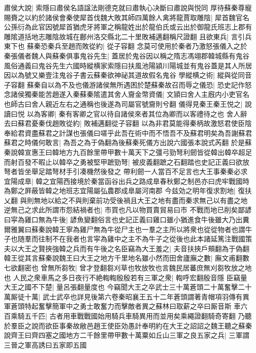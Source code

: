 肅侯大說|{
	索隱曰肅侯名語諡法剛德克就曰肅執心决斷曰肅說與悦同}
厚待蘇秦尊寵賜賚之以約於諸侯會秦使犀首伐魏大敗其師四萬餘人禽將龍賈取雕陰|{
	犀首魏官名公孫衍為此官因號犀首猶虎牙將軍之稱龍姓出於龍伯氏或云出於御龍氏班志上郡有雕隂道括地志雕陰故城在鄜州洛交縣北二十里敗補邁翻稱尺證翻}
且欲東兵|{
	言引兵東下也}
蘇秦恐秦兵至趙而敗從約|{
	從子容翻}
念莫可使用於秦者乃激怒張儀入之於秦張儀者魏人與蘇秦俱事鬼谷先生|{
	蓋居於鬼谷因以稱之隋志馮翊郡韓城縣有鬼谷風俗通義曰鬼谷先生六國時縱横家索隱曰扶風池陽潁川陽城並有鬼谷蓋是其人所居因以為號又樂壹注鬼谷子書云蘇秦欲神祕其道故假名鬼谷}
學縱横之術|{
	縱與從同音子容翻}
蘇秦自以為不及也儀游諸侯無所遇困於楚蘇秦故召而辱之儀恐|{
	恐史記作怒}
念諸侯獨秦能苦趙遂入秦蘇秦隂遣其舍人齎金幣資儀|{
	文頴曰舍人主廐内小吏官名也師古曰舍人親近左右之通稱也後遂為司屬官號齎則兮翻}
儀得見秦王秦王悦之|{
	說讀曰悦}
以為客卿|{
	秦有客卿之官以待自諸侯來者其位為卿而以客禮待之也}
舍人辭去曰蘇君憂秦伐趙敗從約|{
	敗補邁翻從子容翻}
以為非君莫能得秦柄故激怒君使臣陰奉給君資盡蘇君之計謀也張儀曰嗟乎此吾在術中而不悟吾不及蘇君明矣為吾謝蘇君蘇君之時儀何敢言|{
	為吾之為于偽翻為後蘇秦死儀方出說六國張本說式芮翻}
於是蘇秦說韓宣惠王曰韓地方九百餘里帶甲數十萬天下之彊弓勁弩利劒皆從韓出韓卒超足而射百發不暇止以韓卒之勇被堅甲蹠勁弩|{
	被皮義翻蹠之石翻踏也史記正義曰欲放弩者皆坐舉足踏弩材手引凑機然後發之}
帶利劒一人當百不足言也大王事秦秦必求宜陽成臯|{
	韓之宜陽西接境於秦當函谷出兵之路成臯春秋鄭之制邑亦曰虎牢戰國時為鄭之屛蔽皆韓之地班志宜陽屬弘農郡成臯屬河南郡}
今兹効之明年復求割地|{
	復扶乂翻}
與則無地以給之不與則棄前功受後禍且大王之地有盡而秦求無己以有盡之地逆無己之求此所謂市怨結禍者也|{
	市買也凡以物買賣貿易曰市}
不戰而地已削矣鄙諺曰寜為雞口無為牛後|{
	諺魚變翻俗言也史記正義曰雞口雖小猶進食牛後雖大乃出糞爾雅翼曰蘇秦說韓王寧為雞尸無為牛從尸主也一羣之主所以將衆也從從物者也謂牛子也随羣而往制不在我者也言寜為雞中之主不為牛子之從後也此本諸延篤注戰國策}
夫以大王之賢挾強韓之兵而有牛後之名臣竊為大王羞之|{
	夫音扶挾戶頰翻為于偽翻}
韓王從其言蘇秦說魏王曰大王之地方千里地名雖小然而田舍廬廡之數|{
	廡文甫翻數七欲翻密也}
曾無所芻牧|{
	曾才登翻芻刈草也牧放牧也言魏民居蕃庶無刈芻牧放之地也}
人民之衆車馬之多日夜行不絶輷輷殷殷若有三軍之衆|{
	輷呼宏翻殷音隱}
臣竊量大王之國不下楚|{
	量呂張翻量度也}
今竊聞大王之卒武士三十萬蒼頭二十萬奮擊二十萬厮徒十萬|{
	武士武卒也詳見後第六卷秦昭襄王五十二年蒼頭謂著青帽項羽傳有異軍蒼頭特起奮擊簡軍中之勇士敢奮力而擊敵者異之蘇林曰取薪之卒曰厮音斯}
車六百乘騎五千匹|{
	古者用車戰戰國始用騎兵車騎異用而並用矣乘繩證翻騎奇寄翻}
乃聽於羣臣之說而欲臣事秦故敝邑趙王使臣効愚計奉明約在大王之詔詔之魏王聽之蘇秦說齊王曰齊四塞之國地方二千餘里帶甲數十萬粟如丘山三軍之良五家之兵|{
	三軍謂三晉之軍高誘曰五家即五國}
